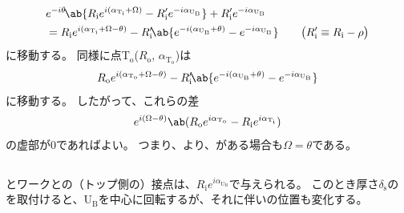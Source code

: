 \begin{align}
  \notag
  & e^{-i\theta}\!
    \ab\{R_\mathrm ie^{i(\alpha_{\mathrm T_\mathrm i}+\Omega)}
           -R_\mathrm i'e^{-i\alpha_{\mathrm U_\mathrm B}}\}
    +R_\mathrm i'e^{-i\alpha_{\mathrm U_\mathrm B}}\\
  & = R_\mathrm ie^{i(\alpha_{\mathrm T_\mathrm i}+\Omega-\theta)}
      -R_\mathrm i'\!
       \ab\{e^{-i(\alpha_{\mathrm U_\mathrm B}+\theta)}-e^{-i\alpha_{\mathrm U_\mathrm B}}\}\qquad
    \big(R_\mathrm i' \equiv R_\mathrm i-\rho\big)
    \label{eq:afterftUfinite}
\end{align}
に移動する。
同様に点T$_\mathrm o$($R_\mathrm o$, $\alpha_{\mathrm T_\mathrm o}$)は
\begin{align*}
  R_\mathrm oe^{i(\alpha_{\mathrm T_\mathrm o}+\Omega-\theta)}
  -R_\mathrm i'\!
   \ab\{e^{-i(\alpha_{\mathrm U_\mathrm B} + \theta)} - e^{-i\alpha_{\mathrm U_\mathrm B}}\}
\end{align*}
に移動する。
したがって、これらの差
\begin{align*}
  e^{i(\Omega-\theta)}
  \ab(R_\mathrm oe^{i\alpha_{\mathrm T_\mathrm o}} - R_\mathrm ie^{i\alpha_{\mathrm T_\mathrm i}})
\end{align*}
の虚部が0であればよい。
つまり、より、\ReceiverPlate がある場合も$\Omega = \theta$である。


\subsection{\ReceiverPlateContactPoint}
\ReceiverPlate とワークとの（トップ側の）接点は、$R_\mathrm ie^{i\alpha_{\mathrm U_\mathrm B}}$で与えられる。
このとき厚さ$\delta_\mathrm s$の\Spacer を取付けると、U$_\mathrm B$を中心に回転するが、それに伴い\ReceiverPlateContactPoint の位置も変化する。


